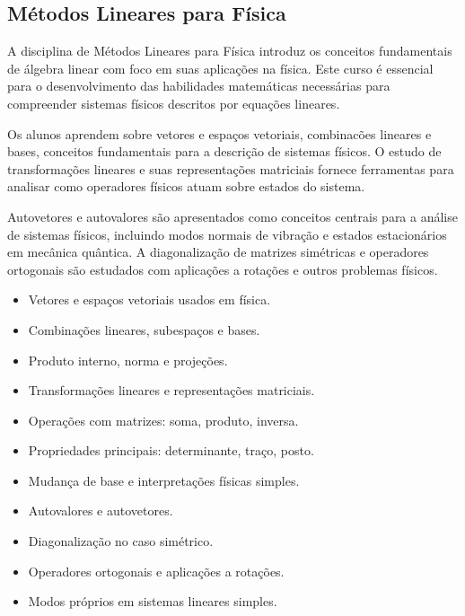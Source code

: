 \documentclass[a4paper, 12pt]{article}
\newcounter{mat}
\begin{document}
\subsection{Métodos Lineares para Física}
\label{mat005}

A disciplina de Métodos Lineares para Física introduz os conceitos fundamentais de
álgebra linear com foco em suas aplicações na física. Este curso é essencial para o
desenvolvimento das habilidades matemáticas necessárias para compreender sistemas
físicos descritos por equações lineares.

Os alunos aprendem sobre vetores e espaços vetoriais, combinacões lineares e bases,
conceitos fundamentais para a descrição de sistemas físicos. O estudo de transformações
lineares e suas representações matriciais fornece ferramentas para analisar como
operadores físicos atuam sobre estados do sistema.

Autovetores e autovalores são apresentados como conceitos centrais para a análise de
sistemas físicos, incluindo modos normais de vibração e estados estacionários em
mecânica quântica. A diagonalização de matrizes simétricas e operadores ortogonais são
estudados com aplicações a rotações e outros problemas físicos.

\begin{tcolorbox}[title=Ementa:]
    \begin{itemize}
        \item Vetores e espaços vetoriais usados em física.
        \item Combinações lineares, subespaços e bases.
        \item Produto interno, norma e projeções.
        \item Transformações lineares e representações matriciais.
        \item Operações com matrizes: soma, produto, inversa.
        \item Propriedades principais: determinante, traço, posto.
        \item Mudança de base e interpretações físicas simples.
        \item Autovalores e autovetores.
        \item Diagonalização no caso simétrico.
        \item Operadores ortogonais e aplicações a rotações.
        \item Modos próprios em sistemas lineares simples.
    \end{itemize}
\end{tcolorbox}
\end{document}
